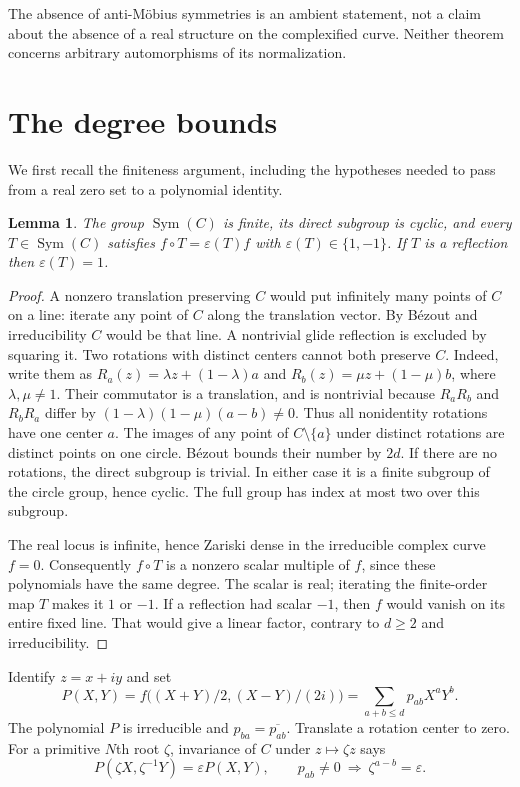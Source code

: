\documentclass[11pt,a4paper]{article}
\newtheorem{lemma}[theorem]{Lemma}
\theoremstyle{definition}
\DeclareMathOperator{\Sym}{Sym}
\begin{document}
The absence of anti-M\"obius symmetries is an ambient statement, not a
claim about the absence of a real structure on the complexified curve.
Neither theorem concerns arbitrary automorphisms of its normalization.

\section{The degree bounds}

We first recall the finiteness argument, including the hypotheses needed
to pass from a real zero set to a polynomial identity.

\begin{lemma}\label{lem:sign}
The group $\Sym(C)$ is finite, its direct subgroup is cyclic, and
every $T\in\Sym(C)$ satisfies $f\circ T=\varepsilon(T)f$ with
$\varepsilon(T)\in\{1,-1\}$. If $T$ is a reflection then
$\varepsilon(T)=1$.
\end{lemma}

\begin{proof}
A nonzero translation preserving $C$ would put infinitely many points
of $C$ on a line: iterate any point of $C$ along the translation vector.
By B\'ezout and irreducibility $C$ would be that line. A nontrivial
glide reflection is excluded by squaring it.
Two rotations with distinct centers cannot both preserve $C$.
Indeed, write them as $R_a(z)=\lambda z+(1-\lambda)a$ and
$R_b(z)=\mu z+(1-\mu)b$, where $\lambda,\mu\ne1$.
Their commutator is a translation, and is nontrivial because
$R_{a}R_{b}$ and $R_{b}R_{a}$ differ by
$(1-\lambda)(1-\mu)(a-b)\ne0$.
Thus all nonidentity rotations have one center $a$.
The images of any point of $C\setminus\{a\}$ under distinct rotations
are distinct points on one circle. B\'ezout bounds their number by $2d$.
If there are no rotations, the direct subgroup is trivial.
In either case it is a finite subgroup of the circle group, hence cyclic.
The full group has index at most two over this subgroup.

The real locus is infinite, hence Zariski dense in the irreducible
complex curve $f=0$. Consequently $f\circ T$ is a nonzero scalar
multiple of $f$, since these polynomials have the same degree.
The scalar is real; iterating the finite-order map $T$ makes it $1$ or
$-1$. If a reflection had scalar $-1$, then $f$ would vanish on its
entire fixed line. That would give a linear factor, contrary to $d\ge2$
and irreducibility.
\end{proof}

Identify $z=x+iy$ and set
\[
 P(X,Y)=f\bigl((X+Y)/2,(X-Y)/(2i)\bigr)
       =\sum_{a+b\le d}p_{ab}X^{a}Y^{b}.
\]
The polynomial $P$ is irreducible and $p_{ba}=\overline{p_{ab}}$.
Translate a rotation center to zero. For a primitive $N$th root
$\zeta$, invariance of $C$ under $z\mapsto\zeta z$ says
\begin{equation}\label{eq:weights}
 P(\zeta X,\zeta^{-1}Y)=\varepsilon P(X,Y),\qquad
 p_{ab}\ne0\ \Longrightarrow\ \zeta^{a-b}=\varepsilon.
\end{equation}
\end{document}
